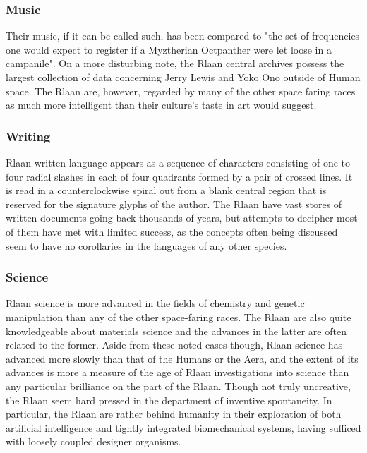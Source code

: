 \subsubsection{Music}

Their music, if it can be called such, has been compared to "the set
of frequencies one would expect to register if a Myztherian Octpanther
were let loose in a campanile". On a more disturbing note, the Rlaan
central archives possess the largest collection of data concerning
Jerry Lewis and Yoko Ono outside of Human space. The Rlaan are,
however, regarded by many of the other space faring races as much more
intelligent than their culture's taste in art would suggest.

\subsubsection{Writing}

Rlaan written language appears as a sequence of characters consisting
of one to four radial slashes in each of four quadrants formed by a
pair of crossed lines. It is read in a counterclockwise spiral out
from a blank central region that is reserved for the signature glyphs
of the author. The Rlaan have vast stores of written documents going
back thousands of years, but attempts to decipher most of them have
met with limited success, as the concepts often being discussed seem
to have no corollaries in the languages of any other species.

\subsubsection{Science}

Rlaan science is more advanced in the fields of chemistry and genetic
manipulation than any of the other space-faring races. The Rlaan are
also quite knowledgeable about materials science and the advances in
the latter are often related to the former. Aside from these noted
cases though, Rlaan science has advanced more slowly than that of the
Humans or the Aera, and the extent of its advances is more a measure
of the age of Rlaan investigations into science than any particular
brilliance on the part of the Rlaan. Though not truly uncreative, the
Rlaan seem hard pressed in the department of inventive spontaneity. In
particular, the Rlaan are rather behind humanity in their exploration
of both artificial intelligence and tightly integrated biomechanical
systems, having sufficed with loosely coupled designer organisms.

